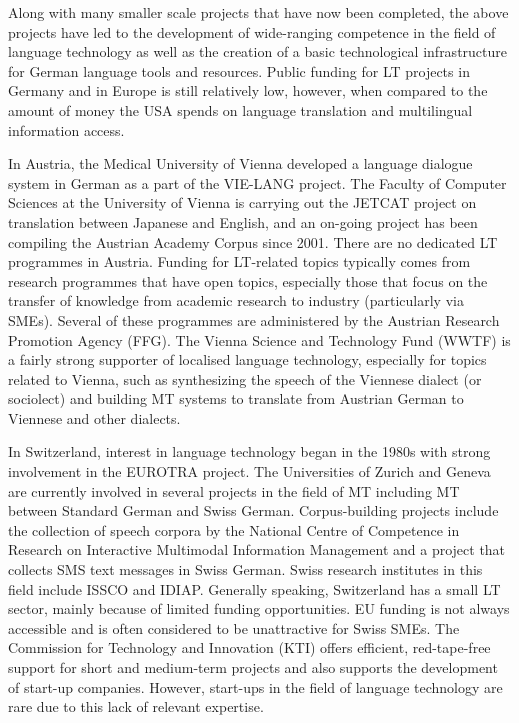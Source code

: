 \documentclass[]{../../metanetpaper}
\begin{document}
\begin{Parallel}[c]{80mm}{80mm}
{    Along with many smaller scale projects that have now been completed, the above projects have led to the development of wide-ranging competence in the field of language technology as well as the creation of a basic technological infrastructure for German language tools and resources. Public funding for LT projects in Germany and in Europe is still relatively low, however, when compared to the amount of money the USA spends on language translation and multilingual information access\cite{laz1}. 

    In Austria, the Medical University of Vienna developed a language dialogue system in German as a part of the VIE-LANG project. The Faculty of Computer Sciences at the University of Vienna is carrying out the JETCAT project on translation between Japanese and English, and an on-going project has been compiling the Austrian Academy Corpus since 2001. There are no dedicated LT programmes in Austria. Funding for LT-related topics typically comes from research programmes that have open topics, especially those that focus on the transfer of knowledge from academic research to industry (particularly via SMEs). Several of these programmes are administered by the Austrian Research Promotion Agency (FFG). The Vienna Science and Technology Fund (WWTF) is a fairly strong supporter of localised language technology, especially for topics related to Vienna, such as synthesizing the speech of the Viennese dialect (or sociolect) and building MT systems to translate from Austrian German to Viennese and other dialects. 

    In Switzerland, interest in language technology began in the 1980s with strong involvement in the EUROTRA project. The Universities of Zurich and Geneva are currently involved in several projects in the field of MT including MT between Standard German and Swiss German\cite{latl1}. Corpus-building projects include the collection of speech corpora by the National Centre of Competence in Research on Interactive Multimodal Information Management and a project that collects SMS text messages in Swiss German\cite{sor1}. Swiss research institutes in this field include ISSCO and IDIAP. Generally speaking, Switzerland has a small LT sector, mainly because of limited funding opportunities. EU funding is not always accessible and is often considered to be unattractive for Swiss SMEs. The Commission for Technology and Innovation (KTI) offers efficient, red-tape-free support for short and medium-term projects and also supports the development of start-up companies. However, start-ups in the field of language technology are rare due to this lack of relevant expertise.

}
\end{Parallel}
\end{document}
